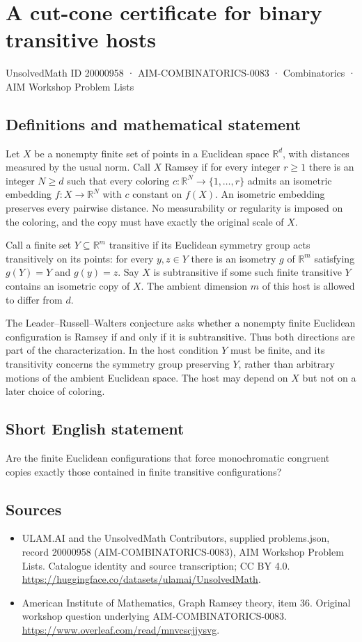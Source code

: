 \documentclass[11pt,a4paper]{article}
\begin{document}
\section*{A cut-cone certificate for binary transitive hosts}\label{20000958}
{\small UnsolvedMath ID 20000958 · AIM-COMBINATORICS-0083 · Combinatorics · AIM Workshop Problem Lists}
\subsection{Definitions and mathematical statement}
Let $X$ be a nonempty finite set of points in a Euclidean space
$\mathbb R^d$, with distances measured by the usual norm. Call $X$
Ramsey if for every integer $r\ge1$ there is an integer $N\ge d$ such
that every coloring $c:\mathbb R^N\to\{1,\ldots,r\}$ admits an
isometric embedding $f:X\to\mathbb R^N$ with $c$ constant on $f(X)$.
An isometric embedding preserves every pairwise distance. No
measurability or regularity is imposed on the coloring, and the copy
must have exactly the original scale of $X$.

Call a finite set $Y\subseteq\mathbb R^m$ transitive if its Euclidean
symmetry group acts transitively on its points: for every $y,z\in Y$
there is an isometry $g$ of $\mathbb R^m$ satisfying $g(Y)=Y$ and
$g(y)=z$. Say $X$ is subtransitive if some such finite transitive $Y$
contains an isometric copy of $X$. The ambient dimension $m$ of this
host is allowed to differ from $d$.

The Leader--Russell--Walters conjecture asks whether a nonempty finite
Euclidean configuration is Ramsey if and only if it is subtransitive.
Thus both directions are part of the characterization. In the host
condition $Y$ must be finite, and its transitivity concerns the symmetry
group preserving $Y$, rather than arbitrary motions of the ambient
Euclidean space. The host may depend on $X$ but not on a later choice
of coloring.
\subsection{Short English statement}
Are the finite Euclidean configurations that force monochromatic congruent copies exactly those contained in finite transitive configurations?
\subsection{Sources}
\begin{itemize}
\item[S1] ULAM.AI and the UnsolvedMath Contributors, supplied problems.json, record 20000958 (AIM-COMBINATORICS-0083), AIM Workshop Problem Lists. Catalogue identity and source transcription; CC BY 4.0.
\url{https://huggingface.co/datasets/ulamai/UnsolvedMath}.
\item[S2] American Institute of Mathematics, Graph Ramsey theory, item 36. Original workshop question underlying AIM-COMBINATORICS-0083.
\url{https://www.overleaf.com/read/mnvcscjjysvg}.
\end{itemize}
\end{document}
